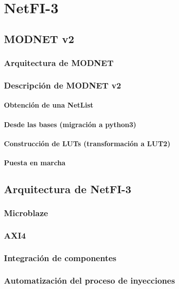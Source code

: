 \chapter{NetFI-3}


\section{MODNET v2}
	\subsection{Arquitectura de MODNET}
	
	\subsection{Descripción de MODNET v2}
	
		\subsubsection{Obtención de una NetList}
		
		\subsubsection{Desde las bases (migración a python3)}
		
		\subsubsection{Construcción de LUTs (transformación a LUT2)}
		
		\subsubsection{Puesta en marcha}
		

\section{Arquitectura de NetFI-3}

	\subsection{Microblaze}
	
	\subsection{AXI4}
	
	\subsection{Integración de componentes}
	
	\subsection{Automatización del proceso de inyecciones}
	
